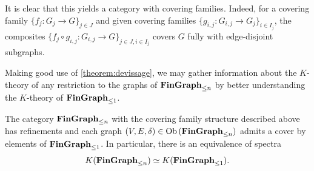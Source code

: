 It is clear that this yields a category with covering families. Indeed, for a covering family $\{f_j : G_j \to G\}_{j \in J}$ and given covering families $\{g_{i,j} : G_{i,j} \to G_{j}\}_{i \in I_j}$, the composites $\{f_j \circ g_{i,j} : G_{i,j} \to G \}_{j \in J, i \in I_j}$ covers $G$ fully with edge-disjoint subgraphs.

Making good use of \cref{theorem:devissage}, we may gather information about the $K$-theory of any restriction to the graphs of $\textbf{FinGraph}_{\leq n}$ by better understanding the $K$-theory of $\textbf{FinGraph}_{\leq 1}$.

\begin{proposition}
    The category $\textbf{FinGraph}_{\leq n}$ with the covering family structure described above has refinements and each graph $(V,E, \delta) \in \operatorname{Ob}{\lparen \textbf{FinGraph}_{\leq n} \rparen}$ admits a cover by elements of $\textbf{FinGraph}_{\leq 1}$. In particular, there is an equivalence of spectra
    \[ K(\textbf{FinGraph}_{\leq n}) \simeq K(\textbf{FinGraph}_{\leq 1}).\]
\end{proposition}